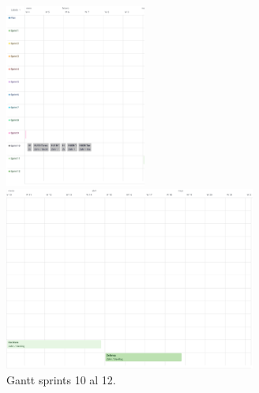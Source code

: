 \documentclass[
11pt, %
]{charter}
\begin{document}
\begin{figure}[htpb]
\begin{flushleft}
\begin{minipage}{0.28\textwidth}
    \includegraphics[height=6cm]{./Figuras/Gantt-3.png}
\end{minipage}%
\begin{minipage}{0.72\textwidth}
    \includegraphics[height=6cm]{./Figuras/Gantt-4.png}
\end{minipage}%

\caption{Gantt sprints 10 al 12.}
\label{fig:diagBloques}
\end{flushleft}
\end{figure}


\vspace{25px}
\end{document}
